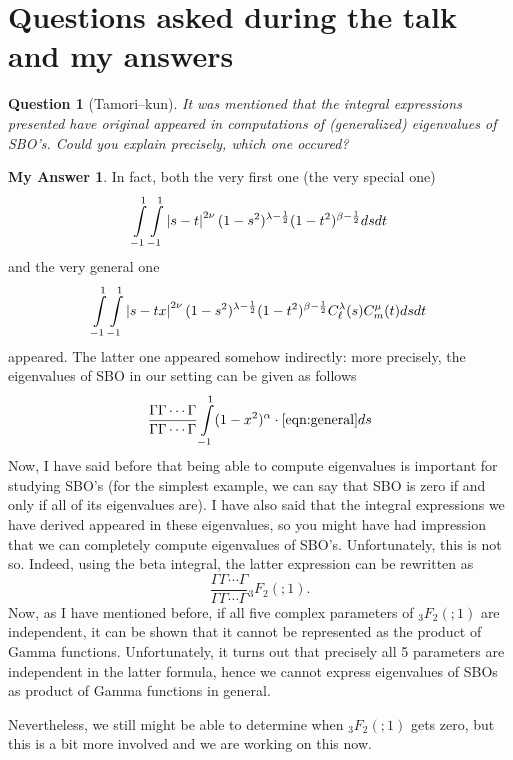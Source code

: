 \documentclass[12pt]{article} %
\theoremstyle{theorem}
\newtheorem{question}{Question}
\theoremstyle{definition}
\newtheorem{answer}{My Answer}
\theoremstyle{remark}
\begin{document}
\section{Questions asked during the talk and my answers}
\begin{question}[Tamori--kun]
    It was mentioned that the integral expressions presented have original appeared
    in computations of (generalized) eigenvalues of SBO's. Could you explain precisely, which one occured?
\end{question}
\begin{answer}
    In fact, both the very first one (the very special one)
    \begin{equation}
        \int_{-1}^1\int_{-1}^1\myabs{s-t}^{2\nu}(1-s^2)^{\lambda-\frac{1}{2}}(1-t^2)^{\beta-\frac{1}{2}}dsdt
        \label{eqn:special}
    \end{equation}
    and the very general one\begin{equation}
        \label{eqn:general}
        \int_{-1}^1\int_{-1}^1\myabs{s-tx}^{2\nu}(1-s^2)^{\lambda-\frac{1}{2}}(1-t^2)^{\beta-\frac{1}{2}}
        C^\lambda_{\ell}(s)C^\mu_m(t)dsdt
    \end{equation}
    appeared. The latter one appeared somehow indirectly:
    more precisely, the eigenvalues of SBO in our setting can be given as follows
    \begin{equation}
        \frac{\Gamma\Gamma\cdots\Gamma}{\Gamma\Gamma\cdots\Gamma}\int_{-1}^1(1-x^2)^\alpha\cdot
        \eqref{eqn:general}ds
    \end{equation}
    Now, I have said before that being able to compute eigenvalues is important for studying SBO's (for the simplest example,
    we can say that SBO is zero if and only if all of its eigenvalues are). I have also said
    that the integral expressions we have derived appeared in these eigenvalues, so you might have had
    impression that we can completely compute eigenvalues of SBO's. Unfortunately, this is not so. Indeed,
    using the beta integral, the latter expression can be rewritten as
    \begin{equation*}
        \frac{\Gamma\Gamma\cdots\Gamma}{\Gamma\Gamma\cdots\Gamma}{}_3F_2(;1).
    \end{equation*}
    Now, as I have mentioned before, if all five complex parameters of ${}_3F_2(;1)$ are 
    independent, it can be shown that it cannot be represented as the product of Gamma functions.
    Unfortunately, it turns out that precisely all 5 parameters are independent in the latter formula,
    hence we cannot express eigenvalues of SBOs as product of Gamma functions in general.
    
    Nevertheless, we still might be able to determine when ${}_3F_2(;1)$ gets zero, but this is 
    a bit more involved and we are working on this now.
\end{answer}
\end{document}
